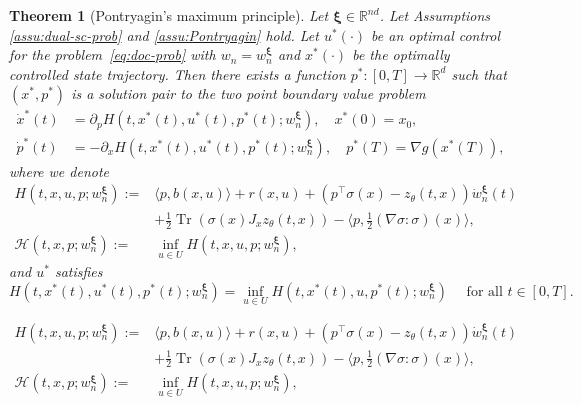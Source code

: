 \documentclass[10pt,a4paper]{amsart}
\newtheorem{theorem}{Theorem}
\newcommand{\R}{\mathbb{R}}
\newcommand{\op}{\operatorname}
\begin{document}
\begin{theorem}[Pontryagin's maximum principle]
\label{thm:pontryagin}
Let $\bm{\xi}\in \R^{nd}$. Let Assumptions \ref{assu:dual-sc-prob} and \ref{assu:Pontryagin} hold. Let $u^*(\cdot)$ be an optimal control for the problem~\eqref{eq:doc-prob} with $w_n = w_n^{\bm{\xi}}$ and $x^*(\cdot)$ be the optimally controlled state trajectory. Then there exists a function $p^*:[0,T] \to \R^d$ such that $(x^*, p^*)$ is a solution pair to the two point boundary value problem 
\begin{equation} \label{eq:two-point-boundary-value-prob}
    \begin{aligned}
        \dot{x}^*(t) &= \partial_p H(t, x^*(t), u^*(t), p^*(t); w_n^{\bm{\xi}}), \quad x^*(0) = x_0, \\
        \dot{p}^*(t) &= -\partial_x H(t,x^*(t), u^*(t), p^*(t); w_n^{\bm{\xi}}), \quad p^*(T) = \nabla g(x^*(T)), 
    \end{aligned}
\end{equation}
where we denote 
\begin{equation} \label{eq:hamiltonian-defi}
\begin{aligned}
    H(t,x,u,p; w_n^{\bm{\xi}}) := &\langle p, b(x,u)\rangle + r(x, u) + \left( p^\top \sigma(x) - z_\theta(t,x) \right) \dot{w}_n^{\bm{\xi}}(t)  \\
    &+ \frac{1}{2}\op{Tr}(\sigma(x) J_xz_\theta(t,x)) - \langle p, \frac{1}{2}(\nabla \sigma:\sigma)(x)\rangle, \\
    \mathcal{H}(t,x,p;w_n^{\bm{\xi}}) :=&\inf_{u\in U} H(t,x,u,p; w_n^{\bm{\xi}}), 
\end{aligned}
\end{equation}
and $u^*$ satisfies 
\begin{equation} \label{eq:u-star}
    H(t, x^*(t), u^*(t), p^*(t); w_n^{\bm{\xi}}) = \inf_{u\in U} H(t, x^*(t), u, p^*(t); w_n^{\bm{\xi}}) \quad \text{ for all } t \in [0,T].
\end{equation}
\end{theorem}

\begin{equation} 
\begin{aligned}
    H(t,x,u,p; w_n^{\bm{\xi}}) := &\langle p, b(x,u)\rangle + r(x, u) + \left( p^\top \sigma(x) - z_\theta(t,x) \right) \dot{w}_n^{\bm{\xi}}(t)  \\
    &+ \frac{1}{2}\op{Tr}(\sigma(x) J_xz_\theta(t,x)) - \langle p, \frac{1}{2}(\nabla \sigma:\sigma)(x)\rangle, \\
    \mathcal{H}(t,x,p;w_n^{\bm{\xi}}) :=&\inf_{u\in U} H(t,x,u,p; w_n^{\bm{\xi}}), 
\end{aligned}
\end{equation}
\end{document}
